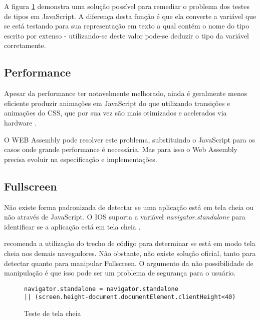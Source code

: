 A figura \ref{fig:fixJSTypes} demonstra uma solução possível para
remediar o problema dos testes de tipos em JavaScript. A diferença
desta função é que ela converte a variável que se está testando
para sua representação em texto a qual contém o nome do tipo escrito
por extenso - utilizando-se deste valor pode-se deduzir o tipo da
variável corretamente.

\subsection{Performance}

Apesar da performance ter notavelmente melhorado, ainda é geralmente
menos eficiente produzir animações em JavaScript do que utilizando
transições e animações do CSS, que por sua vez são mais otimizados
e acelerados via hardware \autocite{html5mostwanted} .

O WEB Assembly pode resolver este problema, substituindo o JavaScript
para os casos onde grande performance é necessária. Mas para isso o
Web Assembly precisa evoluir na especificação e implementações.

\subsection{Fullscreen}

Não existe forma padronizada de detectar se uma aplicação está
em tela cheia ou não através de JavaScript. O IOS suporta a
variável \textit{navigator.standalone } para identificar se a
aplicação está em tela cheia .

\citet{homescreenwebapps} recomenda a utilização do trecho de código
para determinar se está em modo tela cheia nos demais navegadores. Não
obstante, não existe solução oficial, tanto para detectar quanto para
manipular Fullscreen. O argumento da não possibilidade de manipulação
é que isso pode ser um problema de segurança para o usuário.

\begin{figure}[H]
\centering
\begin{verbatim}
navigator.standalone = navigator.standalone 
|| (screen.height-document.documentElement.clientHeight<40)
\end{verbatim}
\caption{Teste de tela cheia}
\label{fig:fixJSTypes}
\end{figure}


